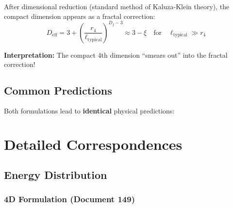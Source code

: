 	After dimensional reduction (standard method of Kaluza-Klein theory), the compact dimension appears as a fractal correction:
	\begin{equation}
		D_{\text{eff}} = 3 + \left(\frac{r_4}{\ell_{\text{typical}}}\right)^{D_f-3} \approx 3 - \xi \quad \text{for} \quad \ell_{\text{typical}} \gg r_4
	\end{equation}
	
	\textbf{Interpretation:} The compact 4th dimension \enquote{smears out} into the fractal correction!
	
	\subsection{Common Predictions}
	
	Both formulations lead to \textbf{identical} physical predictions:
	
	\begin{table}[h]
		\centering
		\caption{Identical predictions of both formulations}
	\end{table}
	
	\section{Detailed Correspondences}
	
	\subsection{Energy Distribution}
	
	\subsubsection{4D Formulation (Document 149)}
	
